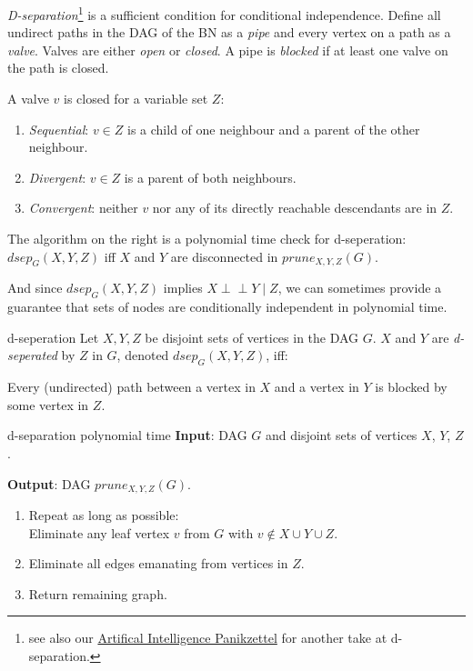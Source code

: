 \documentclass[english]{panikzettel}
\begin{document}
\begin{halfboxl}
	\emph{D-separation}\footnote{see also our \href{https://panikzettel.philworld.de/ai.pdf}{Artifical Intelligence Panikzettel} for another take at d-separation.} is a sufficient condition for conditional independence.
	Define all undirect paths in the DAG of the BN as a \emph{pipe} and every vertex on a path as a \emph{valve}.
	Valves are either \emph{open} or \emph{closed}.
	A pipe is \emph{blocked} if at least one valve on the path is closed.

	A valve $v$ is closed for a variable set $Z$:
	\begin{enumerate}
		\item \emph{Sequential}: $v \in Z$ is a child of one neighbour and a parent of the other neighbour.
		\item \emph{Divergent}: $v \in Z$ is a parent of both neighbours.
		\item \emph{Convergent}: neither $v$ nor any of its directly reachable descendants are in $Z$.
	\end{enumerate}

	The algorithm on the right is a polynomial time check for d-seperation:
	$dsep_G(X,Y,Z)$ iff $X$ and $Y$ are disconnected in $prune_{X,Y,Z}(G)$.

	And since $dsep_G(X,Y,Z)$ implies $X \perp\!\!\!\!\perp Y \mid Z$, we can sometimes provide a guarantee that sets of nodes are conditionally independent in polynomial time.
\end{halfboxl}%
\begin{halfboxr}
	\vspace{-\baselineskip}
	\begin{defi}{d-seperation}
		Let $X,Y,Z$ be disjoint sets of vertices in the DAG $G$.
		$X$ and $Y$ are \emph{d-seperated} by $Z$ in $G$, denoted $dsep_G(X,Y,Z)$, iff:

		Every (undirected) path between a vertex in $X$ and a vertex in $Y$ is blocked by some vertex in $Z$.
	\end{defi}

	\begin{algo}{d-separation polynomial time}
		\textbf{Input}: DAG $G$ and disjoint sets of vertices $X$, $Y$, $Z$.

		\textbf{Output}: DAG $prune_{X,Y,Z}(G)$.
		\tcblower
		\begin{enumerate}
			\item Repeat as long as possible: \\
			      Eliminate any leaf vertex $v$ from $G$ with $v \notin X \cup Y \cup Z$.
			\item Eliminate all edges emanating from  vertices in $Z$.
			\item Return remaining graph.
		\end{enumerate}
	\end{algo}
\end{halfboxr}
\end{document}
